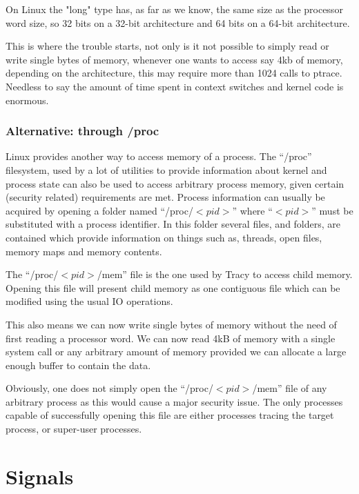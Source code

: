 \documentclass[a4paper, 10pt]{report}
\begin{document}
On Linux the "long" type has, as far as we know, the same size as the
processor word size, so 32 bits on a 32-bit architecture and
64 bits on a 64-bit architecture.

This is where the trouble starts, not only is it not possible to simply read
or write single bytes of memory, whenever one wants to access say 4kb of
memory, depending on the architecture, this may require more than 1024
calls to ptrace. Needless to say the amount of time spent in context switches
and kernel code is enormous.

\subsubsection{Alternative: through /proc}
Linux provides another way to access memory of a process. The ``/proc''
filesystem, used by a lot of utilities to provide information about kernel
and process state can also be used to access arbitrary process memory,
given certain (security related) requirements are met.
Process information can usually be acquired by opening a folder
named ``/proc/$<pid>$'' where ``$<pid>$'' must be substituted with a process
identifier. In this folder several files, and folders, are contained which
provide information on things such as, threads, open files, memory maps and
memory contents.

The ``/proc/$<pid>$/mem'' file is the one used by Tracy to access child memory.
Opening this file will present child memory as one contiguous file which
can be modified using the usual IO operations.

This also means we can now write single bytes of memory without the need
of first reading a processor word. We can now read 4kB of memory with a
single system call or any arbitrary amount of memory provided we can allocate
a large enough buffer to contain the data.

Obviously, one does not simply open the ``/proc/$<pid>$/mem'' file of any
arbitrary process as this would cause a major security issue. The only
processes capable of successfully opening this file are either processes
tracing the target process, or super-user processes.


\section{Signals}
\end{document}
